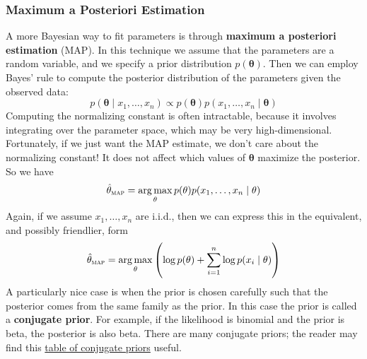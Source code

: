 \documentclass{article}
\DeclareMathOperator*{\argmax}{arg\,max}
\renewcommand{\vec}[1]{\mathbf{#1}}
\newcommand{\term}[1]{\textbf{#1}}
\begin{document}
\subsubsection{Maximum a Posteriori Estimation}
A more Bayesian way to fit parameters is through \term{maximum a posteriori estimation} (MAP). In this technique we assume that the parameters are a random variable, and we specify a prior distribution $p(\vec{\theta})$. Then we can employ Bayes' rule to compute the posterior distribution of the parameters given the observed data:
\[p(\vec{\theta} \mid x_1, \dots, x_n) \propto p(\vec{\theta})p(x_1, \dots, x_n \mid \vec{\theta})\]
Computing the normalizing constant is often intractable, because it involves integrating over the parameter space, which may be very high-dimensional. Fortunately, if we just want the MAP estimate, we don't care about the normalizing constant! It does not affect which values of $\vec{\theta}$ maximize the posterior. So we have
\[\hat{\vec{\theta}}_\textsc{map} = \argmax_\vec{\theta} p(\vec{\theta})p(x_1, \dots, x_n \mid \vec{\theta})\]
Again, if we assume $x_1, \dots, x_n$ are i.i.d., then we can express this in the equivalent, and possibly friendlier, form
\[\hat{\vec{\theta}}_\textsc{map} = \argmax_\vec{\theta} \left(\log p(\vec{\theta}) + \sum_{i=1}^n \log p(x_i \mid \vec{\theta})\right)\]
A particularly nice case is when the prior is chosen carefully such that the posterior comes from the same family as the prior. In this case the prior is called a \term{conjugate prior}. For example, if the likelihood is binomial and the prior is beta, the posterior is also beta. There are many conjugate priors; the reader may find this \href{https://en.wikipedia.org/wiki/Conjugate_prior#Table_of_conjugate_distributions}{table of conjugate priors} useful.

\newpage


\nocite{*}
\end{document}

